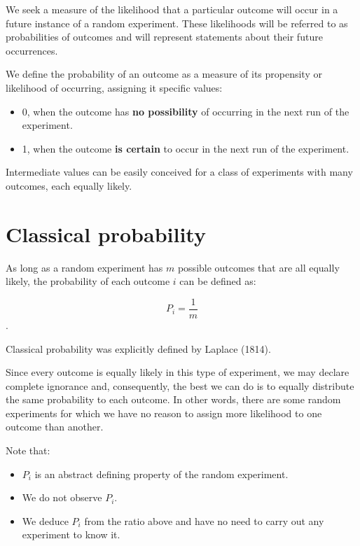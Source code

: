\documentclass[
]{book}
\providecommand{\tightlist}{%
  \setlength{\itemsep}{0pt}\setlength{\parskip}{0pt}}
\begin{document}
We seek a measure of the likelihood that a particular outcome will occur in a future instance of a random experiment. These likelihoods will be referred to as probabilities of outcomes and will represent statements about their future occurrences.

We define the probability of an outcome as a measure of its propensity or likelihood of occurring, assigning it specific values:

\begin{itemize}
\tightlist
\item
  0, when the outcome has \textbf{no possibility} of occurring in the next run of the experiment.
\item
  1, when the outcome \textbf{is certain} to occur in the next run of the experiment.
\end{itemize}

Intermediate values can be easily conceived for a class of experiments with many outcomes, each equally likely.

\hypertarget{classical-probability}{%
\section{Classical probability}\label{classical-probability}}

As long as a random experiment has \(m\) possible outcomes that are all equally likely, the probability of each outcome \(i\) can be defined as:

\[P_i =\frac{1}{m}\].

Classical probability was explicitly defined by Laplace (1814).

Since every outcome is equally likely in this type of experiment, we may declare complete ignorance and, consequently, the best we can do is to equally distribute the same probability to each outcome. In other words, there are some random experiments for which we have no reason to assign more likelihood to one outcome than another.

Note that:

\begin{itemize}
\tightlist
\item
  \(P_i\) is an abstract defining property of the random experiment.
\item
  We do not observe \(P_i\).
\item
  We deduce \(P_i\) from the ratio above and have no need to carry out any experiment to know it.
\end{itemize}
\end{document}
